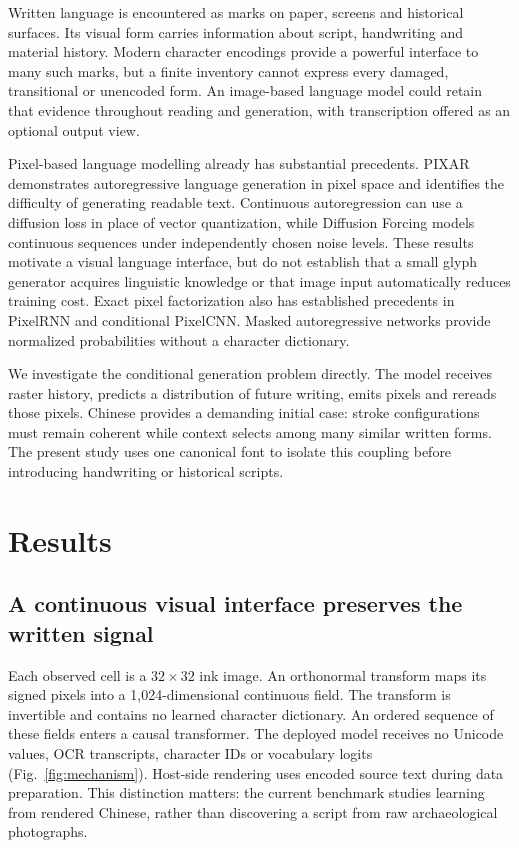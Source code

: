 Written language is encountered as marks on paper, screens and historical
surfaces. Its visual form carries information about script, handwriting and
material history. Modern character encodings provide a powerful interface to
many such marks, but a finite inventory cannot express every damaged,
transitional or unencoded form. An image-based language model could retain
that evidence throughout reading and generation, with transcription offered
as an optional output view.

Pixel-based language modelling already has substantial precedents.
PIXAR demonstrates autoregressive language generation in pixel space and
identifies the difficulty of generating readable text\cite{pixar}. Continuous
autoregression can use a diffusion loss in place of vector quantization\cite{mar},
while Diffusion Forcing models continuous sequences under independently chosen
noise levels\cite{forcing}. These results motivate a visual language interface,
but do not establish that a small glyph generator acquires linguistic
knowledge or that image input automatically reduces training cost.
Exact pixel factorization also has established precedents in PixelRNN and
conditional PixelCNN\cite{pixelrnn,pixelcnn}. Masked autoregressive networks
provide normalized probabilities without a character dictionary\cite{made}.

We investigate the conditional generation problem directly. The model
receives raster history, predicts a distribution of future writing, emits
pixels and rereads those pixels. Chinese provides a demanding initial case:
stroke configurations must remain coherent while context selects among many
similar written forms. The present study uses one canonical font to isolate
this coupling before introducing handwriting or historical scripts.

\section*{Results}
\subsection*{A continuous visual interface preserves the written signal}
Each observed cell is a $32\times32$ ink image. An orthonormal transform maps
its signed pixels into a 1,024-dimensional continuous field. The transform is
invertible and contains no learned character dictionary. An ordered sequence
of these fields enters a causal transformer. The deployed model receives no
Unicode values, OCR transcripts, character IDs or vocabulary logits
(Fig.~\ref{fig:mechanism}). Host-side rendering uses encoded source text during
data preparation. This distinction matters: the current benchmark studies
learning from rendered Chinese, rather than discovering a script from raw
archaeological photographs.

